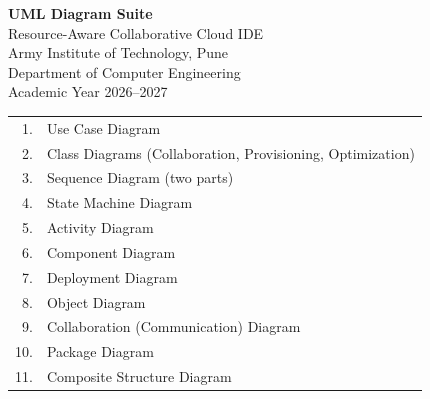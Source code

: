 \documentclass[10pt,a4paper]{article}
\begin{document}
\thispagestyle{empty}
\vspace*{5cm}
\begin{center}
{\Huge\bfseries UML Diagram Suite}\\[6mm]
{\LARGE Resource-Aware Collaborative Cloud IDE}\\[2cm]
{\large Army Institute of Technology, Pune}\\[1mm]
{\large Department of Computer Engineering}\\[1mm]
{\large Academic Year 2026--2027}\\[2.5cm]
\begin{tabular}{rl}
1. & Use Case Diagram\\
2. & Class Diagrams (Collaboration, Provisioning, Optimization)\\
3. & Sequence Diagram (two parts)\\
4. & State Machine Diagram\\
5. & Activity Diagram\\
6. & Component Diagram\\
7. & Deployment Diagram\\
8. & Object Diagram\\
9. & Collaboration (Communication) Diagram\\
10. & Package Diagram\\
11. & Composite Structure Diagram
\end{tabular}
\end{center}
\end{document}
